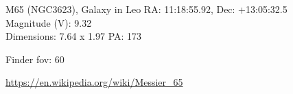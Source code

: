 \begin{block}{M65 (NGC3623), Galaxy in Leo}
    RA: 11:18:55.92, Dec: +13:05:32.5 \\ 
    Magnitude (V): 9.32 \\ 
    Dimensions: 7.64 x 1.97 PA: 173 

    Finder fov: 60 

    \url{https://en.wikipedia.org/wiki/Messier_65} 
\end{block}